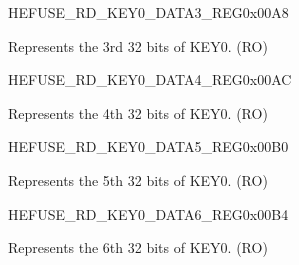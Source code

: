 \begin{register}{H}{EFUSE\_RD\_KEY0\_DATA3\_REG}{0x00A8}\label{regdesc:EFUSERDKEY0DATA3REG}
%
\regnewline%
\begin{regdesc}\begin{reglist}
\label{fielddesc:EFUSEKEY0DATA3}\item [EFUSE\_KEY0\_DATA3] Represents the 3rd 32 bits of KEY0. (RO)
\end{reglist}\end{regdesc}
\end{register}


\begin{register}{H}{EFUSE\_RD\_KEY0\_DATA4\_REG}{0x00AC}\label{regdesc:EFUSERDKEY0DATA4REG}
%
\regnewline%
\begin{regdesc}\begin{reglist}
\label{fielddesc:EFUSEKEY0DATA4}\item [EFUSE\_KEY0\_DATA4] Represents the 4th 32 bits of KEY0. (RO)
\end{reglist}\end{regdesc}
\end{register}


\begin{register}{H}{EFUSE\_RD\_KEY0\_DATA5\_REG}{0x00B0}\label{regdesc:EFUSERDKEY0DATA5REG}
%
\regnewline%
\begin{regdesc}\begin{reglist}
\label{fielddesc:EFUSEKEY0DATA5}\item [EFUSE\_KEY0\_DATA5] Represents the 5th 32 bits of KEY0. (RO)
\end{reglist}\end{regdesc}
\end{register}


\begin{register}{H}{EFUSE\_RD\_KEY0\_DATA6\_REG}{0x00B4}\label{regdesc:EFUSERDKEY0DATA6REG}
%
\regnewline%
\begin{regdesc}\begin{reglist}
\label{fielddesc:EFUSEKEY0DATA6}\item [EFUSE\_KEY0\_DATA6] Represents the 6th 32 bits of KEY0. (RO)
\end{reglist}\end{regdesc}
\end{register}



